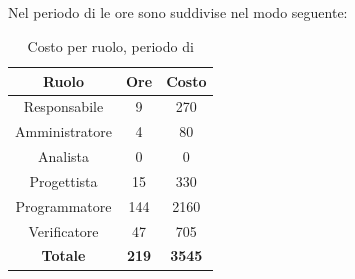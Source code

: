 \subsection{\Cod}
Nel periodo di \Cod{} le ore sono suddivise nel modo seguente:
\begin{table}[H]
	\centering
	\begin{tabular}{|c|c|c|}
		\hline
		\textbf{Ruolo} &
		\textbf{Ore} &
		\textbf{Costo} \\
		\hline
		Responsabile & 9 & 270 \\
		\hline
		Amministratore & 4 & 80 \\
		\hline
		Analista & 0 & 0\\
		\hline
		Progettista & 15 & 330 \\
		\hline
		Programmatore & 144 & 2160 \\
		\hline
		Verificatore & 47 & 705 \\
		\hline
		\textbf{Totale} & \textbf{219} & \textbf{3545} \\
		\hline
	\end{tabular}
	\caption{Costo per ruolo, periodo di \Cod}
\end{table}

